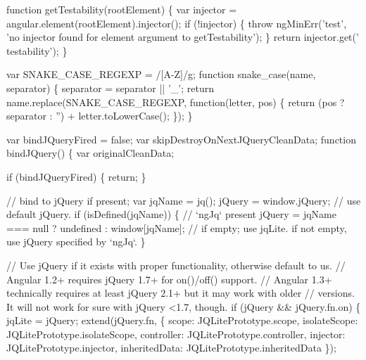 \begin{DoxyCodeInclude}
{\textcolor{keyword}{function} getTestability(rootElement) \{
  var injector = angular.element(rootElement).injector();
  \textcolor{keywordflow}{if} (!injector) \{
    \textcolor{keywordflow}{throw} ngMinErr(\textcolor{stringliteral}{'test'},
      \textcolor{stringliteral}{'no injector found for element argument to getTestability'});
  \}
  \textcolor{keywordflow}{return} injector.get(\textcolor{stringliteral}{'$$testability'});
\}

var SNAKE\_CASE\_REGEXP = /[A-Z]/g;
\textcolor{keyword}{function} snake\_case(name, separator) \{
  separator = separator || \textcolor{charliteral}{'\_'};
  \textcolor{keywordflow}{return} name.replace(SNAKE\_CASE\_REGEXP, \textcolor{keyword}{function}(letter, pos) \{
    \textcolor{keywordflow}{return} (pos ? separator : \textcolor{stringliteral}{''}) + letter.toLowerCase();
  \});
\}

var bindJQueryFired = \textcolor{keyword}{false};
var skipDestroyOnNextJQueryCleanData;
\textcolor{keyword}{function} bindJQuery() \{
  var originalCleanData;

  \textcolor{keywordflow}{if} (bindJQueryFired) \{
    \textcolor{keywordflow}{return};
  \}

  \textcolor{comment}{// bind to jQuery if present;}
  var jqName = jq();
  jQuery = window.jQuery; \textcolor{comment}{// use default jQuery.}
  \textcolor{keywordflow}{if} (isDefined(jqName)) \{ \textcolor{comment}{// `ngJq` present}
    jQuery = jqName === null ? undefined : window[jqName]; \textcolor{comment}{// if empty; use jqLite. if not empty, use
       jQuery specified by `ngJq`.}
  \}

  \textcolor{comment}{// Use jQuery if it exists with proper functionality, otherwise default to us.}
  \textcolor{comment}{// Angular 1.2+ requires jQuery 1.7+ for on()/off() support.}
  \textcolor{comment}{// Angular 1.3+ technically requires at least jQuery 2.1+ but it may work with older}
  \textcolor{comment}{// versions. It will not work for sure with jQuery <1.7, though.}
  \textcolor{keywordflow}{if} (jQuery && jQuery.fn.on) \{
    jqLite = jQuery;
    extend(jQuery.fn, \{
      scope: JQLitePrototype.scope,
      isolateScope: JQLitePrototype.isolateScope,
      controller: JQLitePrototype.controller,
      injector: JQLitePrototype.injector,
      inheritedData: JQLitePrototype.inheritedData
    \});

}
\end{DoxyCodeInclude}
